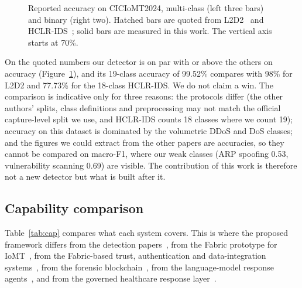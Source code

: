 \documentclass[preprint,12pt]{elsarticle}
\begin{document}
\begin{figure}[htbp]
\centering
{}
\caption{Reported accuracy on CICIoMT2024, multi-class (left three bars) and binary (right two). Hatched bars are quoted from L2D2~\cite{akar2025} and HCLR-IDS~\cite{shaikh2025}; solid bars are measured in this work. The vertical axis starts at 70\%.}
\label{fig:cmpdet}
\end{figure}

On the quoted numbers our detector is on par with or above the others on accuracy (Figure~\ref{fig:cmpdet}), and its 19-class accuracy of 99.52\% compares with 98\% for L2D2 and 77.73\% for the 18-class HCLR-IDS. We do not claim a win. The comparison is indicative only for three reasons: the protocols differ (the other authors' splits, class definitions and preprocessing may not match the official capture-level split we use, and HCLR-IDS counts 18 classes where we count 19); accuracy on this dataset is dominated by the volumetric DDoS and DoS classes; and the figures we could extract from the other papers are accuracies, so they cannot be compared on macro-F1, where our weak classes (ARP spoofing 0.53, vulnerability scanning 0.69) are visible. The contribution of this work is therefore not a new detector but what is built after it.

\subsection{Capability comparison}
\label{sec:compare-cap}
Table~\ref{tab:cap} compares what each system covers. This is where the proposed framework differs from the detection papers~\cite{akar2025,shaikh2025,hafid2025}, from the Fabric prototype for IoMT~\cite{pelekoudas2023}, from the Fabric-based trust, authentication and data-integration systems~\cite{akkal2025,chaudhuri2026,ali2025}, from the forensic blockchain~\cite{xiao2024}, from the language-model response agents~\cite{lin2025,gao2026}, and from the governed healthcare response layer~\cite{kolluru2026}.
\end{document}
